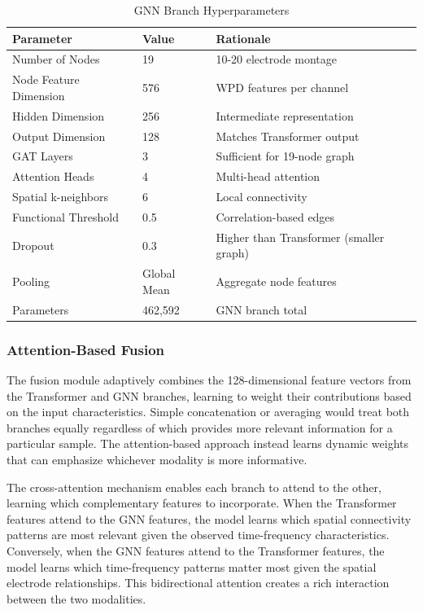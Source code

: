\begin{table}[H]
    \centering
    \small
    \caption{GNN Branch Hyperparameters}
    \label{tab:gnn_params}
    \begin{tabularx}{\textwidth}{|L{4cm}|L{2.5cm}|X|}
        \hline
        \textbf{Parameter} & \textbf{Value} & \textbf{Rationale} \\
        \hline
        Number of Nodes & 19 & 10-20 electrode montage \\
        \hline
        Node Feature Dimension & 576 & WPD features per channel \\
        \hline
        Hidden Dimension & 256 & Intermediate representation \\
        \hline
        Output Dimension & 128 & Matches Transformer output \\
        \hline
        GAT Layers & 3 & Sufficient for 19-node graph \\
        \hline
        Attention Heads & 4 & Multi-head attention \\
        \hline
        Spatial k-neighbors & 6 & Local connectivity \\
        \hline
        Functional Threshold & 0.5 & Correlation-based edges \\
        \hline
        Dropout & 0.3 & Higher than Transformer (smaller graph) \\
        \hline
        Pooling & Global Mean & Aggregate node features \\
        \hline
        Parameters & 462,592 & GNN branch total \\
        \hline
    \end{tabularx}
\end{table}

\subsubsection{Attention-Based Fusion}

The fusion module adaptively combines the 128-dimensional feature vectors from the Transformer and GNN branches, learning to weight their contributions based on the input characteristics. Simple concatenation or averaging would treat both branches equally regardless of which provides more relevant information for a particular sample. The attention-based approach instead learns dynamic weights that can emphasize whichever modality is more informative.

The cross-attention mechanism enables each branch to attend to the other, learning which complementary features to incorporate. When the Transformer features attend to the GNN features, the model learns which spatial connectivity patterns are most relevant given the observed time-frequency characteristics. Conversely, when the GNN features attend to the Transformer features, the model learns which time-frequency patterns matter most given the spatial electrode relationships. This bidirectional attention creates a rich interaction between the two modalities.


